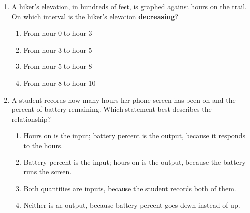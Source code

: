 \documentclass[10pt]{article}
\begin{document}
\begin{enumerate}[leftmargin=1.9em, itemsep=12pt]
\item \begin{minipage}[t]{0.52\linewidth}
      A hiker's elevation, in hundreds of feet, is graphed against hours on the trail. On which
      interval is the hiker's elevation \textbf{decreasing}?
      \begin{enumerate}[leftmargin=2.6em, itemsep=3pt]
        \item[(A)] From hour 0 to hour 3
        \item[(B)] From hour 3 to hour 5
        \item[\textcolor{keyred}{\textbf{$\checkmark$\,(C)}}] From hour 5 to hour 8
        \item[(D)] From hour 8 to hour 10
      \end{enumerate}
      \end{minipage}\hfill
      \begin{minipage}[t]{0.44\linewidth}
      \vspace{-6pt}
      \centering
      \end{minipage}

\item A student records how many hours her phone screen has been on and the percent of battery
      remaining. Which statement best describes the relationship?
      \begin{enumerate}[leftmargin=2.6em, itemsep=2pt]
        \item[\textcolor{keyred}{\textbf{$\checkmark$\,(A)}}] Hours on is the input; battery percent is the output, because it responds to the hours.
        \item[(B)] Battery percent is the input; hours on is the output, because the battery runs the screen.
        \item[(C)] Both quantities are inputs, because the student records both of them.
        \item[(D)] Neither is an output, because battery percent goes down instead of up.
      \end{enumerate}

\end{enumerate}
\end{document}
